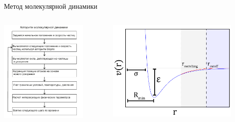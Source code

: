 \documentclass{beamer} %
\begin{document}
\begin{frame}{Метод молекулярной динамики}
  \footnotesize{

    \begin{columns}
      \begin{column}{0.4\linewidth}

        \centering
        \includegraphics[width=\textwidth]{blocksheme}

      \end{column}

      \begin{column}{0.5\linewidth}

        \begin{figure}
          \centering
          \includegraphics[width=\textwidth]{Lj-cutoff-scheme}
        \end{figure}


\end{column}
\end{columns}}
\end{frame}
\end{document}
